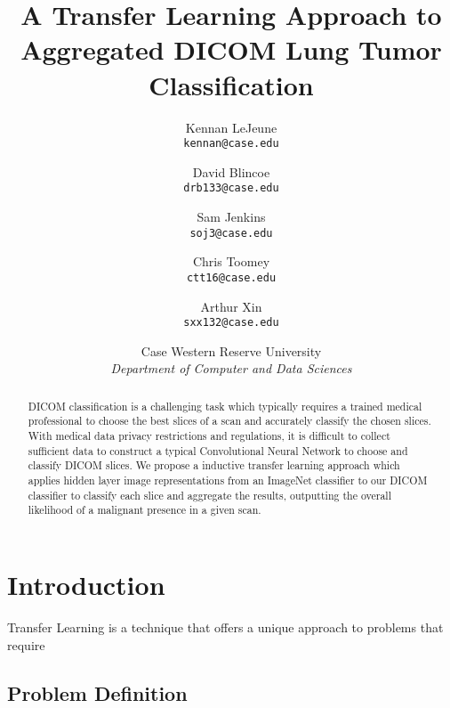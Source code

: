 \documentclass[10pt,twocolumn,letterpaper]{article}
\begin{document}
\title{A Transfer Learning Approach to Aggregated DICOM Lung Tumor Classification}

\author{Kennan LeJeune\\
   {\tt\small kennan@case.edu}
   \and
   David Blincoe\\
   {\tt\small drb133@case.edu}
   \and
   Sam Jenkins\\
   {\tt\small soj3@case.edu}
   \and
   Chris Toomey\\
   {\tt\small ctt16@case.edu}
   \and
   Arthur Xin\\
   {\tt\small sxx132@case.edu}\\
   \and
   {Case Western Reserve University}\\
   {\textit{Department of Computer and Data Sciences}}
}
\maketitle

\begin{abstract}
   DICOM classification is a challenging task which typically requires a trained medical professional to
   choose the best slices of a scan and accurately classify the chosen slices. With medical data privacy restrictions and regulations, it is difficult to collect sufficient data to construct a typical Convolutional Neural Network to choose and classify DICOM slices. We propose a inductive transfer learning approach which applies hidden layer image representations from an ImageNet classifier to our DICOM classifier to classify each slice and aggregate the results, outputting the overall likelihood of a malignant presence in a given scan.
\end{abstract}

\section{Introduction} \label{intro}

Transfer Learning is a technique that offers a unique approach to problems
that require

   \subsection{Problem Definition} \label{intro-def}
\end{document}

